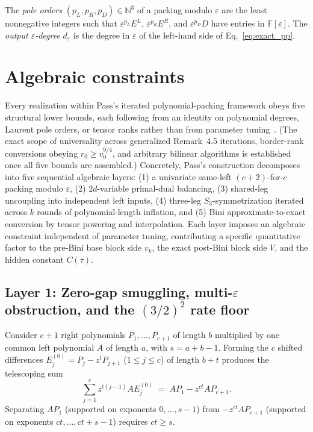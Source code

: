 \documentclass[11pt,a4paper]{article}
\theoremstyle{plain}
\theoremstyle{definition}
\theoremstyle{remark}
\newcommand{\N}{\mathbb{N}}
\newcommand{\F}{\mathbb{F}}
\begin{document}
The \emph{pole orders} $(p_L, p_R, p_D) \in \N^3$ of a packing modulo $\varepsilon$ are the least nonnegative integers such that $\varepsilon^{p_L} E^L$, $\varepsilon^{p_R} E^R$, and $\varepsilon^{p_D} D$ have entries in $\F[\varepsilon]$. The \emph{output $\varepsilon$-degree} $d_\varepsilon$ is the degree in $\varepsilon$ of the left-hand side of Eq.~\eqref{eq:exact_pp}.

\section{Algebraic constraints}
\label{sec:layers}

Every realization within Pass's iterated polynomial-packing framework obeys five structural lower bounds, each following from an identity on polynomial degrees, Laurent pole orders, or tensor ranks rather than from parameter tuning~\cite{Pass2026}. (The exact scope of universality across generalized Remark~4.5 iterations, border-rank conversions obeying $r_0 \ge v_0^{9/4}$, and arbitrary bilinear algorithms is established once all five bounds are assembled.) Concretely, Pass's construction decomposes into five sequential algebraic layers: (1) a univariate same-left $(c + 2)$-for-$c$ packing modulo $\varepsilon$, (2) $2d$-variable primal-dual balancing, (3) shared-leg uncoupling into independent left inputs, (4) three-leg $S_3$-symmetrization iterated across $k$ rounds of polynomial-length inflation, and (5) Bini approximate-to-exact conversion by tensor powering and interpolation. Each layer imposes an algebraic constraint independent of parameter tuning, contributing a specific quantitative factor to the pre-Bini base block side $v_k$, the exact post-Bini block side $V$, and the hidden constant $C(\tau)$.

\subsection{Layer 1: Zero-gap smuggling, multi-\texorpdfstring{$\varepsilon$}{epsilon} obstruction, and the \texorpdfstring{$(3/2)^2$}{(3/2)\textasciicircum 2} rate floor}
\label{subsec:layer1}

Consider $c + 1$ right polynomials $P_1, \dots, P_{c+1}$ of length $b$ multiplied by one common left polynomial $A$ of length $a$, with $s = a + b - 1$. Forming the $c$ shifted differences $E_j^{(0)} = P_j - z^t P_{j+1}$ ($1 \le j \le c$) of length $b + t$ produces the telescoping sum
\begin{equation}
    \sum_{j=1}^c z^{t(j-1)} A E_j^{(0)} \;=\; A P_1 - z^{ct} A P_{c+1} .
    \label{eq:pure_telescoping}
\end{equation}
Separating $A P_1$ (supported on exponents $0, \dots, s - 1$) from $-z^{ct} A P_{c+1}$ (supported on exponents $ct, \dots, ct + s - 1$) requires $ct \ge s$.
\end{document}
